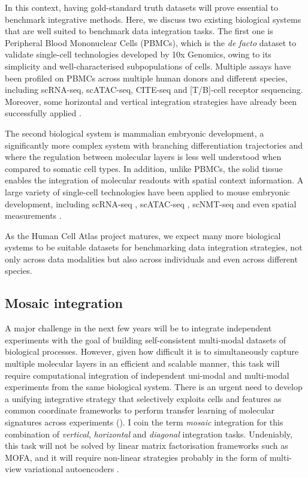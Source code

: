 In this context, having gold-standard truth datasets will prove essential to benchmark integrative methods. Here, we discuss two existing biological systems that are well suited to benchmark data integration tasks. The first one is Peripheral Blood Mononuclear Cells (PBMCs), which is the \textit{de facto} dataset to validate single-cell technologies developed by 10x Genomics, owing to its simplicity and well-characterised subpopulations of cells. Multiple assays have been profiled on PBMCs across multiple human donors and different species, including scRNA-seq, scATAC-seq, CITE-seq and [T/B]-cell receptor sequencing. Moreover, some horizontal and vertical integration strategies have already been successfully applied \cite{Stuart2019b}.

The second biological system is mammalian embryonic development, a significantly more complex system with branching differentiation trajectories and where the regulation between molecular layers is less well understood when compared to somatic cell types. In addition, unlike PBMCs, the solid tissue enables the integration of molecular readouts with spatial context information. A large variety of single-cell technologies have been applied to mouse embryonic development, including scRNA-seq \cite{Pijuan-Sala2019,Mohammed2017,Scialdone2016,Grosswendt2020,Nowotschin2019}, scATAC-seq \cite{Pijuan-Sala2020}, scNMT-seq \cite{Argelaguet2019} and even spatial measurements \cite{Peng2019,VanDenBink2020}.

As the Human Cell Atlas project \cite{Aviv2017} matures, we expect many more biological systems to be suitable datasets for benchmarking data integration strategies, not only across data modalities but also across individuals and even across different species.

\subsection{Mosaic integration} 

A major challenge in the next few years will be to integrate independent experiments with the goal of building self-consistent multi-modal datasets of biological processes. However, given how difficult it is to simultaneously capture multiple molecular layers in an efficient and scalable manner, this task will require computational integration of independent uni-modal and multi-modal experiments from the same biological system. There is an urgent need to develop a unifying integrative strategy that selectively exploits cells and features as common coordinate frameworks to perform transfer learning of molecular signatures across experiments (). I coin the term \textit{mosaic} integration for this combination of \textit{vertical}, \textit{horizontal} and \textit{diagonal} integration tasks. Undeniably, this task will not be solved by linear matrix factorisation frameworks such as MOFA, and it will require non-linear strategies probably in the form of multi-view variational autoencoders \cite{Lopez2018}.

